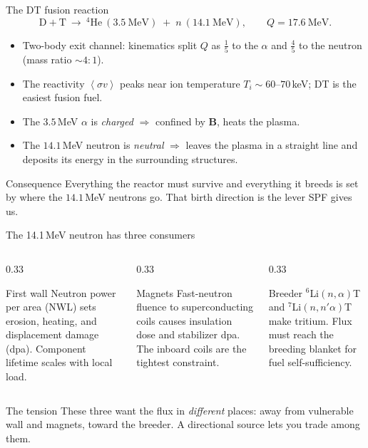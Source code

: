 \documentclass[aspectratio=169]{beamer}
\newcommand{\avg}[1]{\left\langle #1 \right\rangle}
\begin{document}
\begin{frame}[t]{The DT fusion reaction}
\[
\mathrm{D} + \mathrm{T}\ \longrightarrow\ {}^4\mathrm{He}\ (3.5~\mathrm{MeV}) \;+\; n\ (14.1~\mathrm{MeV}),
\qquad Q = 17.6~\mathrm{MeV}.
\]
\begin{itemize}
  \item Two-body exit channel: kinematics split $Q$ as $\tfrac{1}{5}$ to the $\alpha$ and $\tfrac{4}{5}$ to the neutron (mass ratio $\sim 4{:}1$).
  \item The reactivity $\avg{\sigma v}$ peaks near ion temperature $T_i \sim 60$--$70$\,keV; DT is the easiest fusion fuel.
  \item The $3.5$\,MeV $\alpha$ is \emph{charged} $\Rightarrow$ confined by $\bm B$, heats the plasma.
  \item The $14.1$\,MeV neutron is \emph{neutral} $\Rightarrow$ leaves the plasma in a straight line and deposits its energy in the surrounding structures.
\end{itemize}
\begin{block}{Consequence}
Everything the reactor must survive and everything it breeds is set by where the $14.1$\,MeV neutrons go. That birth direction is the lever SPF gives us.
\end{block}
\end{frame}

\begin{frame}[t]{The 14.1\,MeV neutron has three consumers}
\begin{columns}[T]
\begin{column}{0.33\textwidth}
\begin{block}{First wall}
Neutron power per area (NWL) sets erosion, heating, and displacement damage (dpa). Component lifetime scales with local load.
\end{block}
\end{column}
\begin{column}{0.33\textwidth}
\begin{block}{Magnets}
Fast-neutron fluence to superconducting coils causes insulation dose and stabilizer dpa. The inboard coils are the tightest constraint.
\end{block}
\end{column}
\begin{column}{0.33\textwidth}
\begin{block}{Breeder}
$^6$Li$(n,\alpha)$T and $^7$Li$(n,n'\alpha)$T make tritium. Flux must reach the breeding blanket for fuel self-sufficiency.
\end{block}
\end{column}
\end{columns}
\vspace{0.7em}
\begin{block}{The tension}
These three want the flux in \emph{different} places: away from vulnerable wall and magnets, toward the breeder. A directional source lets you trade among them.
\end{block}
\end{frame}
\end{document}
